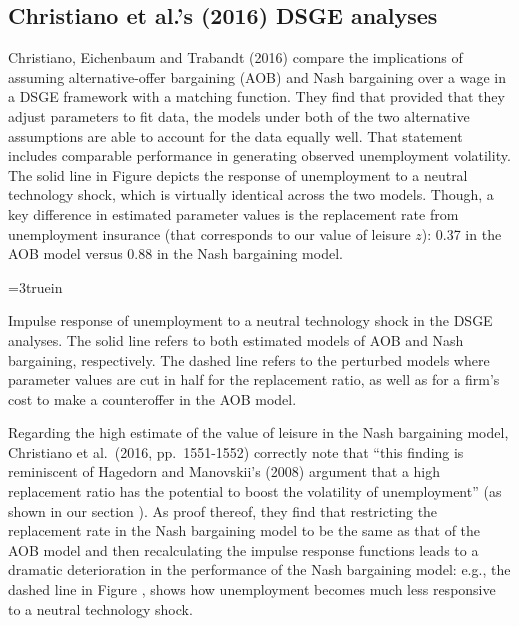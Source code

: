 \subsection{Christiano et al.'s (2016) DSGE analyses}
Christiano, Eichenbaum and Trabandt (2016) compare the implications
of assuming alternative-offer bargaining (AOB) and Nash bargaining
over a wage in  a DSGE framework with a matching function. They find that provided that 
they adjust parameters to fit data, 
the models under both  of  the two alternative assumptions are able to account for
the data equally well. That statement includes comparable performance in   generating observed  unemployment volatility.
The solid line in Figure 
depicts the  response of unemployment to a neutral technology
shock, which is virtually identical across the two models.
Though, a key difference in estimated parameter values is
the replacement rate from unemployment insurance (that
corresponds to our value of leisure $z$): 0.37 in the AOB
model versus 0.88 in the Nash bargaining model.

\centerline{\epsfxsize=3truein}
\caption{Impulse response of unemployment to a neutral
technology shock in the DSGE analyses. The solid line refers
to both estimated models of AOB and Nash bargaining,
respectively. The
dashed line refers to the perturbed models where parameter
values are cut in half for the replacement ratio, as well as
for a firm's cost to make a counteroffer in the AOB model.}
\endfigure

Regarding the high estimate of the value of leisure in the
Nash bargaining model, Christiano et al.\ (2016, pp.~1551-1552)
correctly note that ``this finding is reminiscent of Hagedorn
and Manovskii's (2008) argument that a high replacement ratio has
the potential to boost the volatility of unemployment'' (as
shown in our section ).
As proof thereof, they find that restricting the replacement
rate in the Nash bargaining model to be the same as that of the
AOB model and then recalculating the impulse response functions
leads to a dramatic deterioration in the performance of the Nash
bargaining model: e.g., the dashed line in Figure ,
shows how unemployment becomes much less responsive to
a neutral technology shock.

